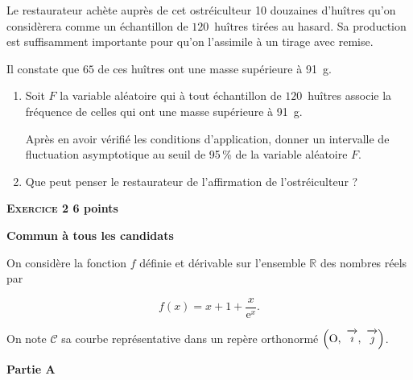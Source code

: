\documentclass[10pt]{article}
\newcommand{\R}{\mathbb{R}}
\newcommand{\vect}[1]{\overrightarrow{\,\mathstrut#1\,}}
\def\Oij{$\left(\text{O},~\vect{\imath},~\vect{\jmath}\right)$}
\begin{document}
\medskip
 
Le restaurateur achète auprès de cet ostréiculteur 10 douzaines d'huîtres qu'on considèrera comme un échantillon de $120$~huîtres tirées au hasard. Sa production est suffisamment importante pour qu'on l'assimile à un tirage avec remise.
 
Il constate que $65$ de ces huîtres ont une masse supérieure à 91~g.

\medskip
 
\begin{enumerate}
\item Soit $F$ la variable aléatoire qui à tout échantillon de $120$~huîtres associe la fréquence de celles qui ont une masse supérieure à 91~g. 

Après en avoir vérifié les conditions d'application, donner un intervalle de fluctuation asymptotique au seuil de 95\,\% de la variable aléatoire $F$. 
\item Que peut penser le restaurateur de l'affirmation de l'ostréiculteur ? 
\end{enumerate} 

\vspace{0,5cm}

\textbf{\textsc{Exercice 2} \hfill 6 points}
 
\textbf{Commun à tous les candidats}

\medskip 

On considère la fonction $f$ définie et dérivable sur l'ensemble $\R$ des nombres réels par 

\[f(x) = x + 1 + \dfrac{x}{\text{e}^x}.\]

On note $\mathcal{C}$ sa courbe représentative dans un repère orthonormé \Oij. 

\medskip

\textbf{Partie A}

\medskip
\end{document}
